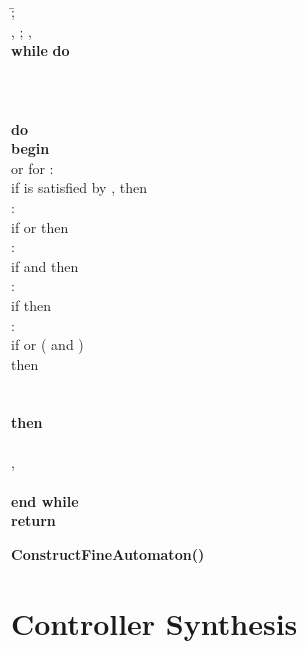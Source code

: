 \begin{algorithm}[t]
\begin{algorithmic}
\begin{tabbing}
\= ; \\
\> , ; , \\ 
\> {\bf while}  {\bf do}\\
\> \quad \\
\>  \\
\> \quad \quad \\
\> \quad {}  {\bf do}\\
\> \quad \quad {}  {\bf begin}\\
\> \quad \quad \quad {}  or  for :\\
\> \quad \quad \quad \quad if  is satisfied by , then \\
\> \quad \quad \quad {}  :\\
\> \quad \quad \quad \quad if  or  then \\
\> \quad \quad \quad {}  :\\
\> \quad \quad \quad \quad if  and  then \\
\> \quad \quad \quad {}  :\\
\> \quad \quad \quad \quad if  then \\
\> \quad \quad \quad {}  :\\
\> \quad \quad \quad \quad if  or ( and )\\
\> \quad \quad \quad \quad then \\
\> \quad \quad {}\\
\> \quad {}\\
\> \quad {}  {\bf then} \\
\> \quad \quad \\
\> \quad \quad , \\
\> \\
\> {\bf end while}\\
\> {\bf return} 
\end{tabbing}
\end{algorithmic}
\caption{
{\bf ConstructFineAutomaton()}\label{algo:fine}}
\end{algorithm}


\section{Controller Synthesis}


